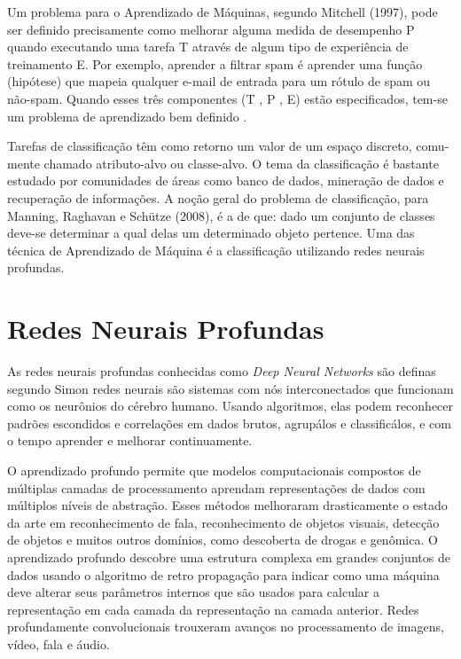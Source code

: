 \documentclass[openright]{UFRGS} %
\begin{document}
Um problema para o Aprendizado de Máquinas, segundo Mitchell (1997), pode
ser definido precisamente como melhorar alguma medida de desempenho P quando executando uma tarefa T através de algum tipo de experiência de treinamento E. Por exemplo, aprender a filtrar spam é aprender uma função (hipótese) que mapeia qualquer e-mail
de entrada para um rótulo de spam ou não-spam. Quando esses três componentes (T , P ,
E) estão especificados, tem-se um problema de aprendizado bem definido \cite{mitchellmachine}.

Tarefas de classificação têm como retorno um valor de um espaço discreto, comu-
mente chamado atributo-alvo ou classe-alvo. O tema da classificação é bastante estudado
por comunidades de áreas como banco de dados, mineração de dados e recuperação de
informações. A noção geral do problema de classificação, para Manning, Raghavan e
Schütze (2008), é a de que: dado um conjunto de classes deve-se determinar a qual delas
um determinado objeto pertence. Uma das técnica de Aprendizado de Máquina é a classificação utilizando redes neurais profundas. 

\section{Redes Neurais Profundas}

As redes neurais profundas conhecidas como \textit{Deep Neural Networks} são definas segundo Simon \cite{haykin2007redes} redes neurais são sistemas com nós interconectados que funcionam como os neurônios do cérebro humano. Usando algoritmos, elas podem reconhecer padrões escondidos e correlações em dados brutos, agrupálos e classificálos, e com o tempo aprender e melhorar continuamente.

O aprendizado profundo permite que modelos computacionais compostos de múltiplas camadas de processamento aprendam representações de dados com múltiplos níveis de abstração. Esses métodos melhoraram drasticamente o estado da arte em reconhecimento de fala, reconhecimento de objetos visuais, detecção de objetos e muitos outros domínios, como descoberta de drogas e genômica. O aprendizado profundo descobre uma estrutura complexa em grandes conjuntos de dados usando o algoritmo de retro propagação para indicar como uma máquina deve alterar seus parâmetros internos que são usados para calcular a representação em cada camada da representação na camada anterior. Redes profundamente convolucionais trouxeram avanços no processamento de imagens, vídeo, fala e áudio.
\end{document}

